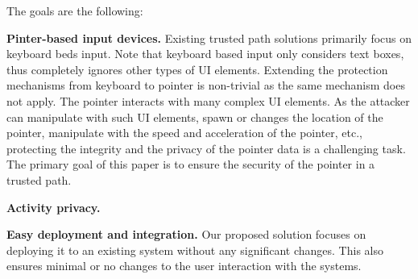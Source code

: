 The goals are the following:

\begin{mylist}
  \item  \textbf{Pinter-based input devices.} Existing trusted path solutions primarily focus on keyboard beds input. Note that keyboard based input only considers text boxes, thus completely ignores other types of UI elements. Extending the protection mechanisms from keyboard to pointer is non-trivial as the same mechanism does not apply. The pointer interacts with many complex UI elements. As the attacker can manipulate with such UI elements, spawn or changes the location of the pointer, manipulate with the speed and acceleration of the pointer, etc., protecting the integrity and the privacy of the pointer data is a challenging task. The primary goal of this paper is to ensure the security of the pointer in a trusted path.
  
   
   
   \item \textbf{Activity privacy.}
   
  \item \textbf{Easy deployment and integration.} Our proposed solution focuses on deploying it to an existing system without any significant changes. This also ensures minimal or no changes to the user interaction with the systems.

\end{mylist}


